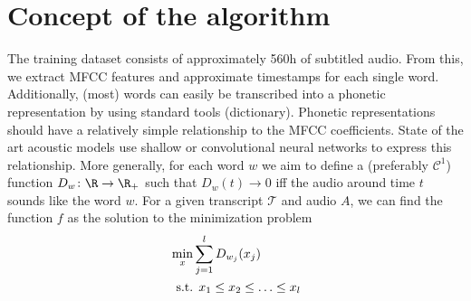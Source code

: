 \chapter{Concept of the algorithm}

The training dataset consists of approximately 560h of subtitled audio. From this, we extract MFCC features and approximate timestamps for each single word. Additionally, (most) words can easily be transcribed into a phonetic representation by using standard tools (dictionary). Phonetic representations should have a relatively simple relationship to the MFCC coefficients. State of the art acoustic models use shallow or convolutional neural networks to express this relationship. More generally, for each word $w$ we aim to define a (preferably $\mathcal{C}^1$) function \(D_w\colon \R \to \R_+\) such that $D_w(t) \to 0$ iff the audio around time $t$ sounds like the word $w$. For a given transcript $\mathcal{T}$ and audio $A$, we can find the function $f$ as the solution to the minimization problem
\begin{align*}
	&\min_x \sum_{j=1}^l D_{w_j}(x_j)\\
	&\hspace{0.5em}\text{s.t. }x_1\leq x_2\leq \dotsc\leq x_l
\end{align*}